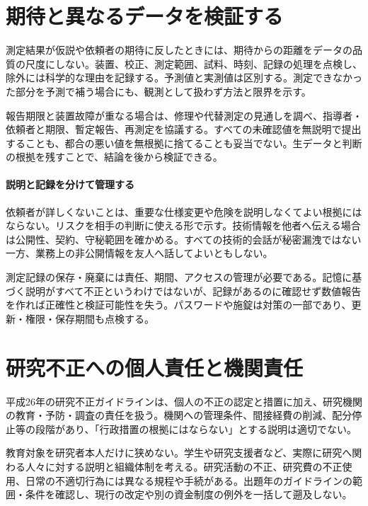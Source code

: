 \section{期待と異なるデータを検証する}
\label{theory:research:validation}
測定結果が仮説や依頼者の期待に反したときには、期待からの距離をデータの品質の尺度にしない。装置、校正、測定範囲、試料、時刻、記録の処理を点検し、除外には科学的な理由を記録する。予測値と実測値は区別する。測定できなかった部分を予測で補う場合にも、観測として扱わず方法と限界を示す\parencite{scj_code2013,mext_misconduct2014}。

報告期限と装置故障が重なる場合は、修理や代替測定の見通しを調べ、指導者・依頼者と期限、暫定報告、再測定を協議する。すべての未確認値を無説明で提出することも、都合の悪い値を無根拠に捨てることも妥当でない。生データと判断の根拠を残すことで、結論を後から検証できる。

\paragraph{説明と記録を分けて管理する}
依頼者が詳しくないことは、重要な仕様変更や危険を説明しなくてよい根拠にはならない。リスクを相手の判断に使える形で示す。技術情報を他者へ伝える場合は公開性、契約、守秘範囲を確かめる。すべての技術的会話が秘密漏洩ではない一方、業務上の非公開情報を友人へ話してよいともしない。

測定記録の保存・廃棄には責任、期間、アクセスの管理が必要である。記憶に基づく説明がすべて不正というわけではないが、記録があるのに確認せず数値報告を作れば正確性と検証可能性を失う。パスワードや施錠は対策の一部であり、更新・権限・保存期間も点検する。

\section{研究不正への個人責任と機関責任}
\label{theory:research:guideline2014}
平成26年の研究不正ガイドラインは、個人の不正の認定と措置に加え、研究機関の教育・予防・調査の責任を扱う。機関への管理条件、間接経費の削減、配分停止等の段階があり、「行政措置の根拠にはならない」とする説明は適切でない\parencite{mext_misconduct2014}。

教育対象を研究者本人だけに狭めない。学生や研究支援者など、実際に研究へ関わる人々に対する説明と組織体制を考える。研究活動の不正、研究費の不正使用、日常の不適切行為には異なる規程や手続がある。出題年のガイドラインの範囲・条件を確認し、現行の改定や別の資金制度の例外を一括して遡及しない。
